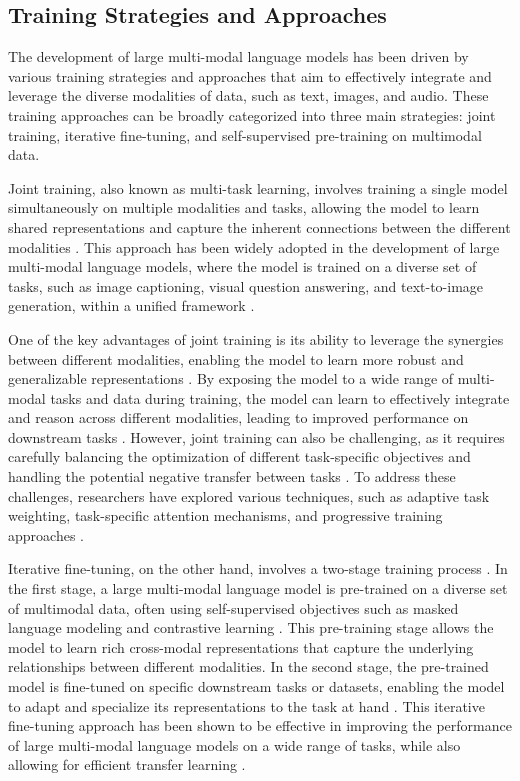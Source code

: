 \documentclass[11pt]{article}
\begin{document}
\subsection{Training Strategies and Approaches}

The development of large multi-modal language models has been driven by various training strategies and approaches that aim to effectively integrate and leverage the diverse modalities of data, such as text, images, and audio. These training approaches can be broadly categorized into three main strategies: joint training, iterative fine-tuning, and self-supervised pre-training on multimodal data.

Joint training, also known as multi-task learning, involves training a single model simultaneously on multiple modalities and tasks, allowing the model to learn shared representations and capture the inherent connections between the different modalities \cite{ref31}. This approach has been widely adopted in the development of large multi-modal language models, where the model is trained on a diverse set of tasks, such as image captioning, visual question answering, and text-to-image generation, within a unified framework \cite{ref32}.

One of the key advantages of joint training is its ability to leverage the synergies between different modalities, enabling the model to learn more robust and generalizable representations \cite{ref33}. By exposing the model to a wide range of multi-modal tasks and data during training, the model can learn to effectively integrate and reason across different modalities, leading to improved performance on downstream tasks \cite{ref34}. However, joint training can also be challenging, as it requires carefully balancing the optimization of different task-specific objectives and handling the potential negative transfer between tasks \cite{ref35}. To address these challenges, researchers have explored various techniques, such as adaptive task weighting, task-specific attention mechanisms, and progressive training approaches \cite{ref36}.

Iterative fine-tuning, on the other hand, involves a two-stage training process \cite{ref37}. In the first stage, a large multi-modal language model is pre-trained on a diverse set of multimodal data, often using self-supervised objectives such as masked language modeling and contrastive learning \cite{ref38}. This pre-training stage allows the model to learn rich cross-modal representations that capture the underlying relationships between different modalities. In the second stage, the pre-trained model is fine-tuned on specific downstream tasks or datasets, enabling the model to adapt and specialize its representations to the task at hand \cite{ref39}. This iterative fine-tuning approach has been shown to be effective in improving the performance of large multi-modal language models on a wide range of tasks, while also allowing for efficient transfer learning \cite{ref40}.
\end{document}
